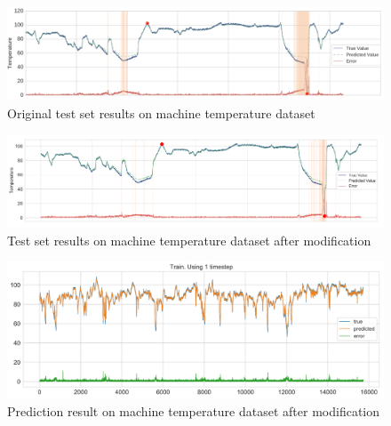 \documentclass{article}
\begin{document}
\begin{figure}[htb]
	    \centering
\includegraphics[scale=0.42]{png/o-testResult.png}
    \caption{Original test set results on machine temperature dataset}
    \label{fig:o-testResult}
\end{figure}

\begin{figure}[htb]
	    \centering
\includegraphics[scale=0.26]{png/m-testResult.png}
    \caption{Test set results on machine temperature dataset after
modification}
    \label{fig:m-testResult}
\end{figure}

\begin{figure}[htb]
	    \centering
\includegraphics[scale=0.21]{png/m-prediction.png}
    \caption{Prediction result on machine temperature dataset after
modification}
    \label{fig:m-prediction}
\end{figure}

\clearpage




\end{document}
